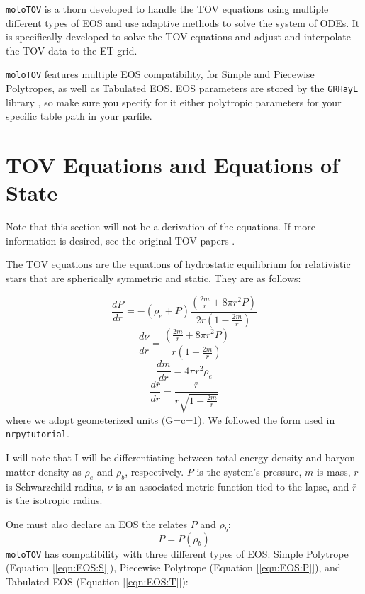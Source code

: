 {\tt moloTOV} is a thorn developed to handle the TOV equations using multiple different types of EOS and use adaptive methods to solve the system of ODEs. It is specifically developed to solve the TOV equations and adjust and interpolate the TOV data to the ET grid.

{\tt moloTOV} features multiple EOS compatibility, for Simple and Piecewise Polytropes, as well as Tabulated EOS. EOS parameters are stored by the {\tt GRHayL} library \cite{GRHayL}, so make sure you specify for it either polytropic parameters for your specific table path in your parfile.

\section{TOV Equations and Equations of State}

Note that this section will not be a derivation of the equations. If more information is desired, see the original TOV papers \cite{Tolman, OppVol}.

The TOV equations are the equations of hydrostatic equilibrium for relativistic stars that are spherically symmetric and static. They are as follows:

\begin{equation}\label{eqn:TOVdP}
\frac{dP}{dr} = -(\rho_e+P)\frac{(\frac{2m}{r}+8\pi r^2P)}{2r(1-\frac{2m}{r})}
\end{equation}
\begin{equation}\label{eqn:TOVdnu}
\frac{d\nu}{dr} = \frac{(\frac{2m}{r}+8\pi r^2P)}{r(1-\frac{2m}{r})}
\end{equation}
\begin{equation}\label{eqn:TOVdM}
\frac{dm}{dr} = 4\pi r^2 \rho_e
\end{equation}
\begin{equation}\label{eqn:TOVdrbar}
\frac{d\bar{r}}{dr} = \frac{\bar{r}}{r\sqrt{1-\frac{2m}{r}}}
\end{equation}
where we adopt geometerized units (G=c=1). We followed the form used in {\tt nrpytutorial}.\cite{NRpy}

I will note that I will be differentiating between total energy density and baryon matter density as $\rho_e$ and $\rho_b$, respectively. $P$ is the system's pressure, $m$ is mass, $r$ is Schwarzchild radius, $\nu$ is an associated metric function tied to the lapse, and $\bar{r}$ is the isotropic radius.

One must also declare an EOS the relates $P$ and $\rho_b$:
\begin{equation}\label{eqn:EOS}
P=P(\rho_b)
\end{equation}
{\tt moloTOV} has compatibility with three different types of EOS: Simple Polytrope (Equation [\ref{eqn:EOS:S}]), Piecewise Polytrope (Equation [\ref{eqn:EOS:P}]), and Tabulated EOS (Equation [\ref{eqn:EOS:T}]):

